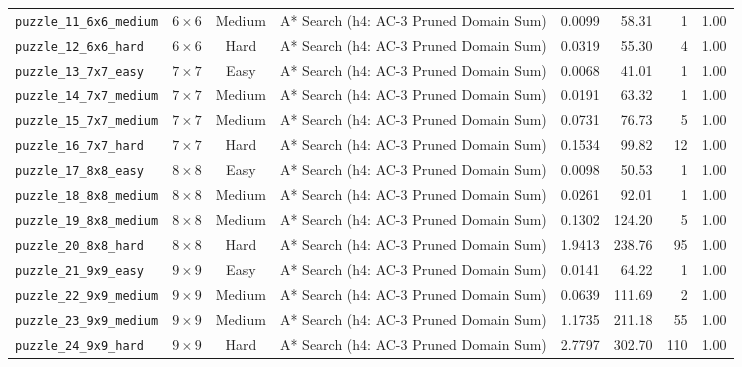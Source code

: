 \documentclass{article}
\begin{document}
\begin{longtable}{@{}lccl r r r c@{}}
  \texttt{puzzle\_11\_6x6\_medium} & $6\times6$ & Medium & A* Search (h4: AC-3 Pruned Domain Sum) & 0.0099 & 58.31 & 1 & 1.00 \\
  \texttt{puzzle\_12\_6x6\_hard} & $6\times6$ & Hard & A* Search (h4: AC-3 Pruned Domain Sum) & 0.0319 & 55.30 & 4 & 1.00 \\
  \texttt{puzzle\_13\_7x7\_easy} & $7\times7$ & Easy & A* Search (h4: AC-3 Pruned Domain Sum) & 0.0068 & 41.01 & 1 & 1.00 \\
  \texttt{puzzle\_14\_7x7\_medium} & $7\times7$ & Medium & A* Search (h4: AC-3 Pruned Domain Sum) & 0.0191 & 63.32 & 1 & 1.00 \\
  \texttt{puzzle\_15\_7x7\_medium} & $7\times7$ & Medium & A* Search (h4: AC-3 Pruned Domain Sum) & 0.0731 & 76.73 & 5 & 1.00 \\
  \texttt{puzzle\_16\_7x7\_hard} & $7\times7$ & Hard & A* Search (h4: AC-3 Pruned Domain Sum) & 0.1534 & 99.82 & 12 & 1.00 \\
  \texttt{puzzle\_17\_8x8\_easy} & $8\times8$ & Easy & A* Search (h4: AC-3 Pruned Domain Sum) & 0.0098 & 50.53 & 1 & 1.00 \\
  \texttt{puzzle\_18\_8x8\_medium} & $8\times8$ & Medium & A* Search (h4: AC-3 Pruned Domain Sum) & 0.0261 & 92.01 & 1 & 1.00 \\
  \texttt{puzzle\_19\_8x8\_medium} & $8\times8$ & Medium & A* Search (h4: AC-3 Pruned Domain Sum) & 0.1302 & 124.20 & 5 & 1.00 \\
  \texttt{puzzle\_20\_8x8\_hard} & $8\times8$ & Hard & A* Search (h4: AC-3 Pruned Domain Sum) & 1.9413 & 238.76 & 95 & 1.00 \\
  \texttt{puzzle\_21\_9x9\_easy} & $9\times9$ & Easy & A* Search (h4: AC-3 Pruned Domain Sum) & 0.0141 & 64.22 & 1 & 1.00 \\
  \texttt{puzzle\_22\_9x9\_medium} & $9\times9$ & Medium & A* Search (h4: AC-3 Pruned Domain Sum) & 0.0639 & 111.69 & 2 & 1.00 \\
  \texttt{puzzle\_23\_9x9\_medium} & $9\times9$ & Medium & A* Search (h4: AC-3 Pruned Domain Sum) & 1.1735 & 211.18 & 55 & 1.00 \\
  \texttt{puzzle\_24\_9x9\_hard} & $9\times9$ & Hard & A* Search (h4: AC-3 Pruned Domain Sum) & 2.7797 & 302.70 & 110 & 1.00 \\
\end{longtable}
\end{document}

